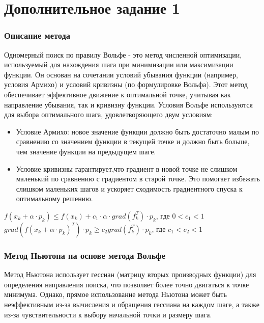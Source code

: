 \documentclass{article}
\begin{document}
\section*{Дополнительное задание 1}

\subsubsection*{Описание метода}

Одномерный поиск по правилу Вольфе - это метод численной оптимизации, используемый для нахождения шага при минимизации или максимизации функции. Он основан на сочетании условий убывания функции (например, условия Армихо) и условий кривизны (по формулировке Вольфа). Этот метод обеспечивает эффективное движение к оптимальной точке, учитывая как направление убывания, так и кривизну функции.
Условия Вольфе используются для выбора оптимального шага, удовлетворяющего двум условиям:
\begin{itemize}
    \item Условие Армихо: новое значение функции должно быть достаточно малым по сравнению со значением функции в текущей точке и должно быть больше, чем значение функции на предыдущем шаге.
     \item Условие кривизны гарантирует,что градиент в новой точке не слишком маленький по сравнению с градиентом в старой точке. Это помогает избежать слишком маленьких шагов и ускоряет сходимость градиентного спуска к оптимальному решению.
\end{itemize}

$f(x_k + \alpha \cdot p_k) \leq f(x_k) + c_1 \cdot \alpha \cdot grad (f^T_k) \cdot p_k$, где $ 0 < c_1 < 1$\\

$grad( f(x_k +  \alpha \cdot p_k)^T)\cdot p_k \geq c_2  grad (f^T_k) \cdot p_k$, где $ c_1 < c_2 < 1$

\subsubsection*{Метод Ньютона на основе метода Вольфе}

Метод Ньютона использует гессиан (матрицу вторых производных функции) для определения направления поиска, что позволяет более точно двигаться к точке минимума. Однако, прямое использование метода Ньютона может быть неэффективным из-за вычисления и обращения гессиана на каждом шаге, а также из-за чувствительности к выбору начальной точки и размеру шага.
\end{document}
